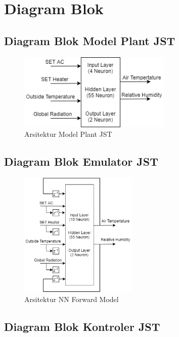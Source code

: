 \chapter{Diagram Blok}

\section{Diagram Blok Model Plant JST}

\begin{figure}[!h]
	\centering
	\includegraphics[width=0.65\textwidth]{figures/NNPlantModelDesign}
	\caption{Arsitektur Model Plant JST}
	\label{fig:C:NNPlantModelDesign}
\end{figure}

\section{Diagram Blok Emulator JST}

\begin{figure}[!h]
	\centering
	\includegraphics[width=0.5\textwidth]{figures/NNForwardModelDesign}
	\caption{Arsitektur NN Forward Model}
	\label{fig:C:NNForwardModelDesign}
\end{figure}
\vspace{2em}

\section{Diagram Blok Kontroler JST}

